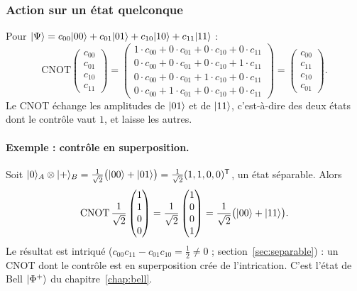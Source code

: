 \subsubsection{Action sur un état quelconque}

Pour $|\Psi\rangle=c_{00}|00\rangle+c_{01}|01\rangle+c_{10}|10\rangle+c_{11}|11\rangle$ :
\[
  \mathrm{CNOT}\begin{pmatrix}c_{00}\\c_{01}\\c_{10}\\c_{11}\end{pmatrix}
  =\begin{pmatrix}
    1\cdot c_{00}+0\cdot c_{01}+0\cdot c_{10}+0\cdot c_{11}\\
    0\cdot c_{00}+0\cdot c_{01}+0\cdot c_{10}+1\cdot c_{11}\\
    0\cdot c_{00}+0\cdot c_{01}+1\cdot c_{10}+0\cdot c_{11}\\
    0\cdot c_{00}+1\cdot c_{01}+0\cdot c_{10}+0\cdot c_{11}
  \end{pmatrix}
  =\begin{pmatrix}c_{00}\\c_{11}\\c_{10}\\c_{01}\end{pmatrix}.
\]
Le CNOT échange les amplitudes de $|01\rangle$ et de $|11\rangle$, c'est-à-dire des deux états
dont le contrôle vaut $1$, et laisse les autres.

\paragraph{Exemple : contrôle en superposition.} Soit $|0\rangle_A\otimes|+\rangle_B
=\frac{1}{\sqrt2}\big(|00\rangle+|01\rangle\big)=\frac{1}{\sqrt2}(1,1,0,0)^{\mathsf T}$,
un état séparable. Alors
\[
  \mathrm{CNOT}\,\frac{1}{\sqrt2}\begin{pmatrix}1\\1\\0\\0\end{pmatrix}
  =\frac{1}{\sqrt2}\begin{pmatrix}1\\0\\0\\1\end{pmatrix}
  =\frac{1}{\sqrt2}\big(|00\rangle+|11\rangle\big).
\]
Le résultat est intriqué ($c_{00}c_{11}-c_{01}c_{10}=\frac12\neq0$ ; section~\ref{sec:separable}) :
un CNOT dont le contrôle est en superposition crée de l'intrication. C'est l'état de Bell
$|\Phi^+\rangle$ du chapitre~\ref{chap:bell}.

